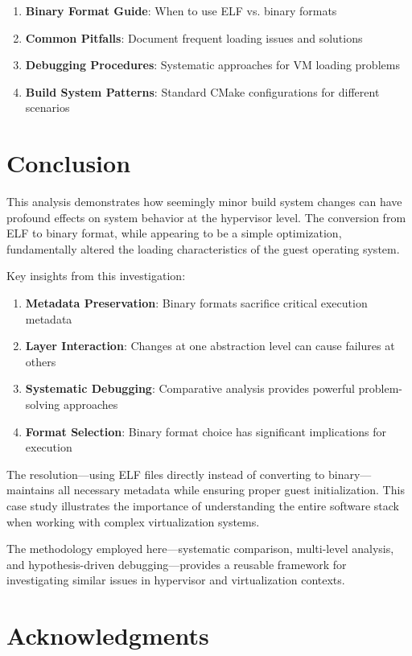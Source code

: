 \documentclass[11pt,a4paper]{article}
\begin{document}
\begin{enumerate}
\item \textbf{Binary Format Guide}: When to use ELF vs. binary formats
\item \textbf{Common Pitfalls}: Document frequent loading issues and solutions
\item \textbf{Debugging Procedures}: Systematic approaches for VM loading problems
\item \textbf{Build System Patterns}: Standard CMake configurations for different scenarios
\end{enumerate}

\section{Conclusion}

This analysis demonstrates how seemingly minor build system changes can have profound effects on system behavior at the hypervisor level. The conversion from ELF to binary format, while appearing to be a simple optimization, fundamentally altered the loading characteristics of the guest operating system.

Key insights from this investigation:

\begin{enumerate}
\item \textbf{Metadata Preservation}: Binary formats sacrifice critical execution metadata
\item \textbf{Layer Interaction}: Changes at one abstraction level can cause failures at others
\item \textbf{Systematic Debugging}: Comparative analysis provides powerful problem-solving approaches
\item \textbf{Format Selection}: Binary format choice has significant implications for execution
\end{enumerate}

The resolution—using ELF files directly instead of converting to binary—maintains all necessary metadata while ensuring proper guest initialization. This case study illustrates the importance of understanding the entire software stack when working with complex virtualization systems.

The methodology employed here—systematic comparison, multi-level analysis, and hypothesis-driven debugging—provides a reusable framework for investigating similar issues in hypervisor and virtualization contexts.

\section*{Acknowledgments}
\end{document}

